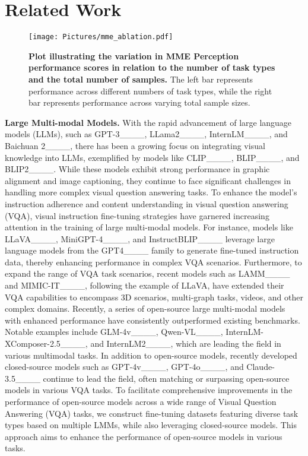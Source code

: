 \section{Related Work}
\begin{wrapfigure}{r}{0.4\textwidth}
    \centering
    \texttt{[image: Pictures/mme\_ablation.pdf]}
    \caption{\textbf{Plot illustrating the variation in MME Perception performance scores in relation to the number of task types and the total number of samples.} The left bar represents performance across different numbers of task types, while the right bar represents performance across varying total sample sizes.}
    \label{fig: ablation_study_mme}
\end{wrapfigure}
\textbf{Large Multi-modal Models.} 
With the rapid advancement of large language models (LLMs), such as GPT-3____, LLama2____, InternLM____, and Baichuan 2____, there has been a growing focus on integrating visual knowledge into LLMs, exemplified by models like CLIP____, BLIP____, and BLIP2____. While these models exhibit strong performance in graphic alignment and image captioning, they continue to face significant challenges in handling more complex visual question answering tasks.
To enhance the model's instruction adherence and content understanding in visual question answering (VQA), visual instruction fine-tuning strategies have garnered increasing attention in the training of large multi-modal models. For instance, models like LLaVA____, MiniGPT-4____, and InstructBLIP____ leverage large language models from the GPT4____ family to generate fine-tuned instruction data, thereby enhancing performance in complex VQA scenarios. Furthermore, to expand the range of VQA task scenarios, recent models such as LAMM____ and MIMIC-IT____, following the example of LLaVA, have extended their VQA capabilities to encompass 3D scenarios, multi-graph tasks, videos, and other complex domains. Recently, a series of open-source large multi-modal models  with enhanced performance have consistently outperformed existing benchmarks. Notable examples include GLM-4v____, Qwen-VL____, InternLM-XComposer-2.5____, and InternLM2____, which are leading the field in various multimodal tasks. In addition to open-source models, recently developed closed-source models such as GPT-4v____, GPT-4o____, and Claude-3.5____ continue to lead the field, often matching or surpassing open-source models in various VQA tasks. To facilitate comprehensive improvements in the performance of open-source models across a wide range of Visual Question Answering (VQA) tasks, we construct fine-tuning datasets featuring diverse task types based on multiple LMMs, while also leveraging closed-source models. This approach aims to enhance the performance of open-source models in various tasks.

